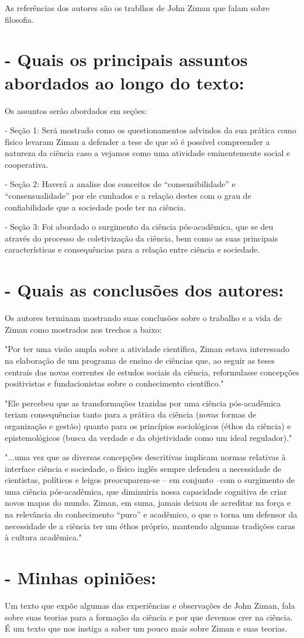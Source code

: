 \documentclass{article}
\begin{document}
As referências dos autores são os trablhos de John Ziman que falam sobre filosofia. 

\section*{- Quais os principais assuntos abordados ao longo do texto:}

Os assuntos serão abordados em seções:

- Seção 1:  Será mostrado como os questionamentos advindos da sua prática como físico levaram Ziman a defender a tese de que só é possível compreender a natureza da ciência caso a vejamos como uma atividade eminentemente social e cooperativa.

- Seção 2: Haverá a analise dos conceitos de “consensibilidade” e “consensualidade” por ele cunhados e a relação destes com o grau de confiabilidade que a sociedade pode ter na ciência. 

- Seção 3: Foi abordado o surgimento da ciência pós-acadêmica, que se deu através do processo de coletivização da ciência, bem como as suas principais características e consequências para a relação entre ciência e sociedade.

\section*{- Quais as conclusões dos autores:}

Os autores terminam mostrando suas conclusões sobre o trabalho e a vida de Ziman como mostrados nos trechos a baixo:

"Por ter uma visão ampla sobre a atividade científica, Ziman estava interessado na elaboração de um programa de ensino de ciências que, ao seguir as teses centrais das novas correntes de estudos sociais da ciência, reformulasse concepções positivistas e fundacionistas sobre o conhecimento científico."

"Ele percebeu que as transformações trazidas por uma ciência pós-acadêmica teriam consequências tanto para a prática da ciência (novas formas de organização e gestão) quanto para os princípios sociológicos (éthos da ciência) e epistemológicos (busca da verdade e da objetividade como um ideal regulador)."

"...uma vez que as diversas concepções descritivas implicam normas relativas à interface ciência e sociedade, o físico inglês sempre defendeu a necessidade de cientistas, políticos e leigos preocuparem-se – em conjunto –com o surgimento de uma ciência pós-acadêmica, que diminuiria nossa capacidade cognitiva de criar novos mapas do mundo. Ziman, em suma, jamais deixou de acreditar na força e na relevância do conhecimento “puro” e acadêmico, o que o torna um defensor da necessidade de a ciência ter um éthos próprio, mantendo algumas tradições caras à cultura acadêmica."

\section*{- Minhas opiniões:}

Um texto que expõe algumas das experiências e observações de John Ziman, fala sobre suas teorias para a formação da ciência e por que devemos crer na ciência. É um texto que nos instiga a saber um pouco mais sobre Ziman e suas teorias.  
\end{document}
